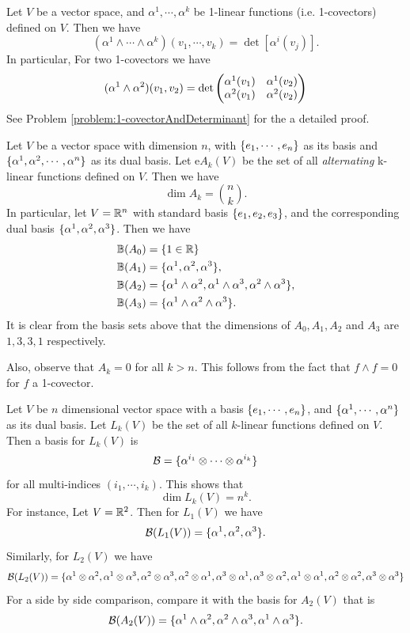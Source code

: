 \begin{summary}
	Let $ V $ be a vector space, and $ \alpha^1,\cdots, \alpha^k $ be 1-linear functions (i.e. 1-covectors) defined on $ V $. Then we have
	\[ (\alpha^1  \wedge \cdots \wedge \alpha^k)(v_1,\cdots,v_k) = \det\left[ \alpha^i(v_j) \right]. \] 
	In particular, For two 1-covectors we have
	\[ (\alpha^1 \wedge \alpha^2)(v_1,v_2) = 
	\det \begin{pmatrix} \alpha^1(v_1) & \alpha^1(v_2) \\ \alpha^2(v_1) & \alpha^2(v_2) \end{pmatrix}
	 \]
	 See Problem \autoref{problem:1-covectorAndDeterminant} for the a detailed proof.
\end{summary}

\begin{summary}
	Let $ V $ be a vector space with dimension $ n $, with $ \{e_1,\cdots,e_n\} $ as its basis and $ \{\alpha^1, \alpha^2, \cdots, \alpha^n\} $ as its dual basis. Let e$ A_k(V) $ be the set of all \textit{alternating} k-linear functions defined on $ V $. 
	Then we have
	\[ \dim A_k = \binom{n}{k}. \]
	In particular, let $ V = \mathbb{R}^n $ with standard basis $ \{e_1,e_2,e_3\} $, and the corresponding dual basis $ \{\alpha^1,\alpha^2,\alpha^3\} $. Then we have
	\begin{align*}
		\mathbb{B}(A_0) &= \{1 \in \mathbb{R}\}\\
		\mathbb{B}(A_1) &= \{\alpha^1,\alpha^2,\alpha^3\},\\
		\mathbb{B}(A_2) &= \{\alpha^1 \wedge \alpha^2, \alpha^1 \wedge \alpha^3, \alpha^2 \wedge \alpha^3\},\\
		\mathbb{B}(A_3) &= \{\alpha^1 \wedge \alpha^2 \wedge \alpha^3\}.
	\end{align*}
	It is clear from the basis sets above that the dimensions of $ A_0,A_1,A_2 $ and $ A_3 $ are $ 1,3,3,1 $ respectively.
	
	Also, observe that $ A_k = 0 $ for all $ k > n $. This follows from the fact that $ f\wedge f = 0 $ for $ f $ a 1-covector.
\end{summary}

\begin{summary}
	Let $ V $ be $ n $ dimensional vector space with a basis $ \{e_1,\cdots,e_n\} $, and $ \{\alpha^1,\cdots,\alpha^n\} $ as its dual basis. Let $ L_k(V) $ be the set of all $ k $-linear functions defined on $ V $. Then a basis for $ L_k(V) $ is
	\[ \mathcal{B} = \{\alpha^{i_1} \otimes \cdots \otimes \alpha^{i_k}\} \]
	for all multi-indices $ (i_1,\cdots,i_k) $. This shows that 
	\[ \dim L_k(V) = n^k. \]
	For instance, Let $ V = \mathbb{R}^2 $. Then for $ L_1(V) $ we have
	\[ \mathcal{B}(L_1(V)) = \{\alpha^1,\alpha^2,\alpha^3\}. \]
	Similarly, for $ L_2(V) $ we have
	\[ \mathcal{B}(L_2(V)) = \{\alpha^1\otimes \alpha^2,\alpha^1\otimes \alpha^3,\alpha^2\otimes \alpha^3,\alpha^2\otimes \alpha^1,\alpha^3\otimes \alpha^1,\alpha^3\otimes \alpha^2,\alpha^1\otimes\alpha^1,\alpha^2\otimes\alpha^2,\alpha^3\otimes\alpha^3\} \]
	For a side by side comparison, compare it with the basis for $ A_2(V) $ that is 
	\[ \mathcal{B}(A_2(V)) = \{\alpha^1 \wedge \alpha^2, \alpha^2 \wedge \alpha^3, \alpha^1 \wedge \alpha^3\}. \]

	
\end{summary}

